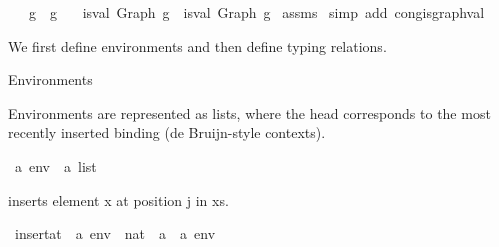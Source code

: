 \begin{isabellebody}
\ \ \ {\isachardoublequoteopen}g{}\ {\isasymsimeq}\ g{}{\isachardoublequoteclose}\isanewline
\ \ \ {\isachardoublequoteopen}is{\isacharunderscore}{\kern0pt}val\ {\isacharparenleft}{\kern0pt}Graph\ g{}{\isacharparenright}{\kern0pt}\ {\isacharequal}{\kern0pt}\ is{\isacharunderscore}{\kern0pt}val\ {\isacharparenleft}{\kern0pt}Graph\ g{}{\isacharparenright}{\kern0pt}{\isachardoublequoteclose}\isanewline
%
\isadelimproof
%
\endisadelimproof
%
\isatagproof
{}\isamarkupfalse%
\ assms\isanewline
{}\isamarkupfalse%
\ {\isacharparenleft}{\kern0pt}simp\ add{\isacharcolon}{\kern0pt}\ cong{\isacharunderscore}{\kern0pt}is{\isacharunderscore}{\kern0pt}graph{\isacharunderscore}{\kern0pt}val{\isacharparenright}{\kern0pt}%
\endisatagproof
{\isafoldproof}%
%
\isadelimproof
%
\endisadelimproof
%
\isadelimdocument
%
\endisadelimdocument
%
\isatagdocument
%
\isamarkuptrue%
%
\endisatagdocument
{\isafolddocument}%
%
\isadelimdocument
%
\endisadelimdocument
%
\begin{isamarkuptext}%
We first define environments and then define typing relations.%
\end{isamarkuptext}\isamarkuptrue%
%
\begin{isamarkuptext}%
Environments%
\end{isamarkuptext}\isamarkuptrue%
%
\begin{isamarkuptext}%
Environments are represented as lists, where the head corresponds to the
most recently inserted binding (de Bruijn-style contexts).%
\end{isamarkuptext}\isamarkuptrue%
\isamarkupfalse%
\ {\isacharparenleft}{\kern0pt}{\isacharprime}{\kern0pt}a{\isacharparenright}{\kern0pt}\ env\ {\isacharequal}{\kern0pt}\ {\isachardoublequoteopen}{\isacharprime}{\kern0pt}a\ list{\isachardoublequoteclose}%
\begin{isamarkuptext}%
 inserts element x at position j in xs.%
\end{isamarkuptext}\isamarkuptrue%
\isamarkupfalse%
\ insert{\isacharunderscore}{\kern0pt}at\ {\isacharcolon}{\kern0pt}{\isacharcolon}{\kern0pt}\ {\isachardoublequoteopen}{\isacharprime}{\kern0pt}a\ env\ {\isacharequal}{\kern0pt}{\isachargreater}{\kern0pt}\ nat\ {\isacharequal}{\kern0pt}{\isachargreater}{\kern0pt}\ {\isacharprime}{\kern0pt}a\ {\isacharequal}{\kern0pt}{\isachargreater}{\kern0pt}\ {\isacharprime}{\kern0pt}a\ env{\isachardoublequoteclose}\ \isanewline

\end{isabellebody}
